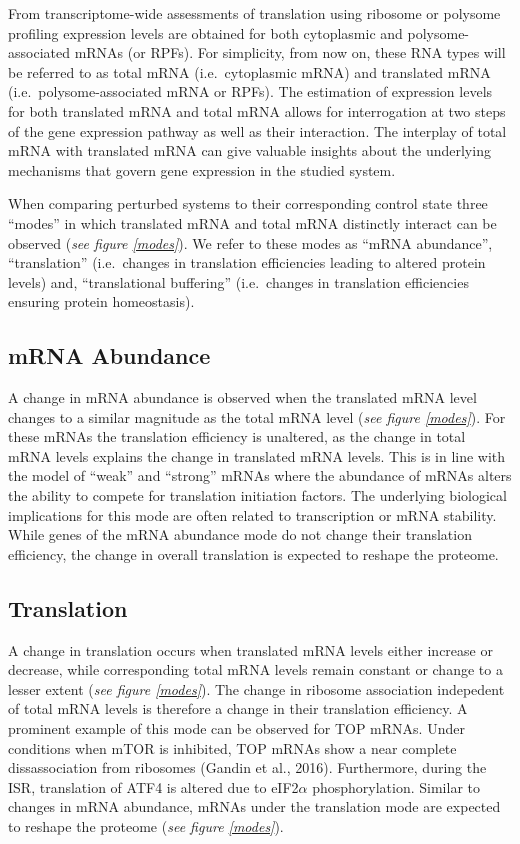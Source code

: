 \documentclass[12pt,openany]{book}
\begin{document}
From transcriptome-wide assessments of translation using ribosome or
polysome profiling expression levels are obtained for both cytoplasmic
and polysome-associated mRNAs (or RPFs). For simplicity, from now on,
these RNA types will be referred to as total mRNA (i.e.~cytoplasmic
mRNA) and translated mRNA (i.e.~polysome-associated mRNA or RPFs). The
estimation of expression levels for both translated mRNA and total mRNA
allows for interrogation at two steps of the gene expression pathway as
well as their interaction. The interplay of total mRNA with translated
mRNA can give valuable insights about the underlying mechanisms that
govern gene expression in the studied system.

When comparing perturbed systems to their corresponding control state
three ``modes'' in which translated mRNA and total mRNA distinctly
interact can be observed (\emph{see figure \ref{modes}}). We refer to
these modes as ``mRNA abundance'', ``translation'' (i.e.~changes in
translation efficiencies leading to altered protein levels) and,
``translational buffering'' (i.e.~changes in translation efficiencies
ensuring protein homeostasis).

\subsection{mRNA Abundance}

A change in mRNA abundance is observed when the translated mRNA level
changes to a similar magnitude as the total mRNA level (\emph{see figure
\ref{modes}}). For these mRNAs the translation efficiency is unaltered,
as the change in total mRNA levels explains the change in translated
mRNA levels. This is in line with the model of ``weak'' and ``strong''
mRNAs where the abundance of mRNAs alters the ability to compete for
translation initiation factors. The underlying biological implications
for this mode are often related to transcription or mRNA stability.
While genes of the mRNA abundance mode do not change their translation
efficiency, the change in overall translation is expected to reshape the
proteome.

\subsection{Translation}

A change in translation occurs when translated mRNA levels either
increase or decrease, while corresponding total mRNA levels remain
constant or change to a lesser extent (\emph{see figure \ref{modes}}).
The change in ribosome association indepedent of total mRNA levels is
therefore a change in their translation efficiency. A prominent example
of this mode can be observed for TOP mRNAs. Under conditions when mTOR
is inhibited, TOP mRNAs show a near complete dissassociation from
ribosomes (Gandin et al., 2016). Furthermore, during the ISR,
translation of ATF4 is altered due to eIF2\(\alpha\) phosphorylation.
Similar to changes in mRNA abundance, mRNAs under the translation mode
are expected to reshape the proteome (\emph{see figure \ref{modes}}).
\end{document}
